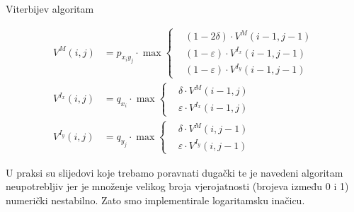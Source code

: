 \documentclass[times, utf8, seminar, numeric]{fer}
\begin{document}
\begin{algorithm}
		\caption{Viterbijev algoritam}
	\label{alg:viterbi}
	\begin{align*}
		V^{M}(i, j) &= p_{x_{i} y_{j}} \cdot \max \left\{ \begin{aligned}
			&(1 - 2\delta) \cdot V^{M}(i - 1, j - 1) \\
			&(1 - \varepsilon) \cdot V^{I_x}(i - 1, j - 1) \\
			&(1 - \varepsilon) \cdot V^{I_y}(i - 1, j - 1)
		\end{aligned}  \\
		V^{I_x}(i, j) &= q_{x_{i}} \cdot \max \left\{ \begin{aligned}
			&\delta \cdot V^{M}(i - 1, j) \\
			&\varepsilon \cdot V^{I_x}(i - 1, j)
		\end{aligned}  \\
		V^{I_y}(i, j) &= q_{y_{j}} \cdot \max \left\{ \begin{aligned}
			&\delta \cdot V^{M}(i, j - 1) \\
			&\varepsilon \cdot V^{I_y}(i, j - 1)
		\end{aligned} 
	\end{align*}
\end{algorithm}

U praksi su slijedovi koje trebamo poravnati dugački te je navedeni algoritam neupotrebljiv jer je množenje velikog broja vjerojatnosti (brojeva između 0 i 1) numerički nestabilno. Zato smo implementirale logaritamsku inačicu.
\end{document}
